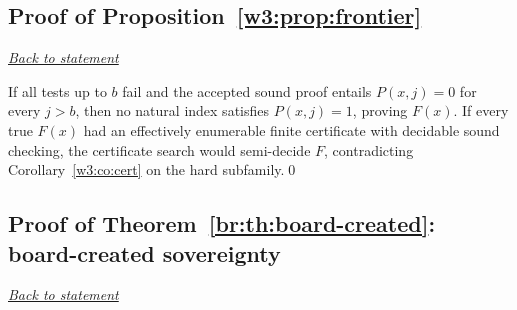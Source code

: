 \documentclass[11pt,letterpaper]{article}
\theoremstyle{definition}\newtheorem{definition}[theorem]{Definition}\newtheorem{example}[theorem]{Example}
\theoremstyle{remark}\newtheorem{remark}[theorem]{Remark}
\newcommand{\backlink}[1]{\noindent\hyperref[#1]{\textit{Back to statement}}\par\smallskip}
\begin{document}
\subsection{Proof of Proposition~\ref{w3:prop:frontier}}\label{w3:pr:frontier}\backlink{w3:prop:frontier}
If all tests up to $b$ fail and the accepted sound proof entails $P(x,j)=0$ for every $j>b$, then no natural index satisfies $P(x,j)=1$, proving $F(x)$. If every true $F(x)$ had an effectively enumerable finite certificate with decidable sound checking, the certificate search would semi-decide $F$, contradicting Corollary~\ref{w3:co:cert} on the hard subfamily.\qed



\subsection{Proof of Theorem~\ref{br:th:board-created}: board-created sovereignty}\label{br:pr:board-created}
\backlink{br:th:board-created}
\end{document}
